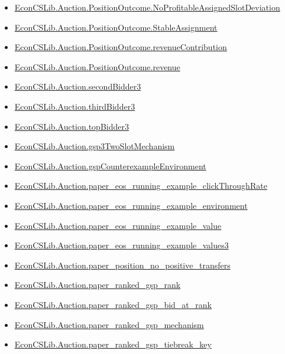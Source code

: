 \documentclass[10pt]{article}
\begin{document}
\begin{itemize}[leftmargin=1.2em]
\begin{itemize}[leftmargin=1.2em]
\item \hyperlink{library-prerequisite-2b41d7e1f47a0768}{EconCSLib.Auction.PositionOutcome.NoProfitableAssignedSlotDeviation}
\item \hyperlink{library-prerequisite-7b1c46bce6957402}{EconCSLib.Auction.PositionOutcome.StableAssignment}
\item \hyperlink{library-prerequisite-d201db52689c7650}{EconCSLib.Auction.PositionOutcome.revenueContribution}
\item \hyperlink{library-prerequisite-c21e6b8ee9d1cf68}{EconCSLib.Auction.PositionOutcome.revenue}
\item \hyperlink{library-prerequisite-cd0db81ab7534571}{EconCSLib.Auction.secondBidder3}
\item \hyperlink{library-prerequisite-e217fa70b1e72f79}{EconCSLib.Auction.thirdBidder3}
\item \hyperlink{library-prerequisite-aa0359a492474e7f}{EconCSLib.Auction.topBidder3}
\item \hyperlink{library-prerequisite-8e6d5133307912f2}{EconCSLib.Auction.gsp3TwoSlotMechanism}
\item \hyperlink{library-prerequisite-57410538697868d0}{EconCSLib.Auction.gspCounterexampleEnvironment}
\item \hyperlink{library-prerequisite-52c19cab57c8668a}{EconCSLib.Auction.paper\_eos\_running\_example\_clickThroughRate}
\item \hyperlink{library-prerequisite-4e321a59b101c6e2}{EconCSLib.Auction.paper\_eos\_running\_example\_environment}
\item \hyperlink{library-prerequisite-85cb71a4150eaf2f}{EconCSLib.Auction.paper\_eos\_running\_example\_value}
\item \hyperlink{library-prerequisite-ccd433ccc1922285}{EconCSLib.Auction.paper\_eos\_running\_example\_values3}
\item \hyperlink{library-prerequisite-5bdbad90afeebe24}{EconCSLib.Auction.paper\_position\_no\_positive\_transfers}
\item \hyperlink{library-prerequisite-790a50fa67b065c9}{EconCSLib.Auction.paper\_ranked\_gsp\_rank}
\item \hyperlink{library-prerequisite-71b9935e9735362a}{EconCSLib.Auction.paper\_ranked\_gsp\_bid\_at\_rank}
\item \hyperlink{library-prerequisite-2c67585d3db1dfec}{EconCSLib.Auction.paper\_ranked\_gsp\_mechanism}
\item \hyperlink{library-prerequisite-b4fe674aa57f6a82}{EconCSLib.Auction.paper\_ranked\_gsp\_tiebreak\_key}

\end{itemize}
\end{itemize}
\end{document}
